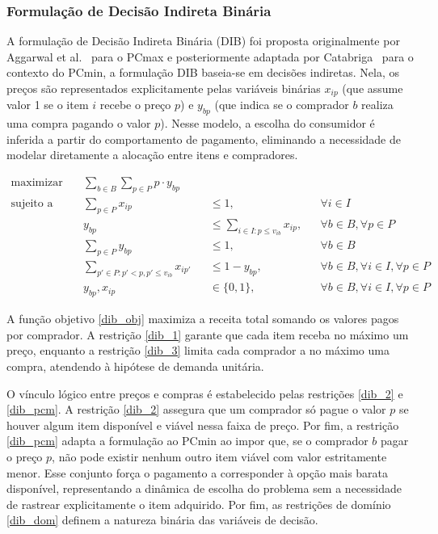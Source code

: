 \documentclass[11pt]{article}
\begin{document}
\subsubsection{Formulação de Decisão Indireta Binária}

A formulação de Decisão Indireta Binária (DIB) foi proposta originalmente por Aggarwal et al.~\cite{aggarwal2004} para o PCmax e posteriormente adaptada por Catabriga~\cite{catabriga2025} para o contexto do PCmin, a formulação DIB baseia-se em decisões indiretas. Nela, os preços são representados explicitamente pelas variáveis binárias $x_{ip}$ (que assume valor 1 se o item $i$ recebe o preço $p$) e $y_{bp}$ (que indica se o comprador $b$ realiza uma compra pagando o valor $p$). Nesse modelo, a escolha do consumidor é inferida a partir do comportamento de pagamento, eliminando a necessidade de modelar diretamente a alocação entre itens e compradores.

\begin{align}
\text{maximizar} \quad & \sum_{b \in B} \sum_{p \in P} p \cdot y_{bp} \label{dib_obj} \\
\text{sujeito a} \quad & \sum_{p \in P} x_{ip} &&\leq 1, && \forall i \in I \label{dib_1} \\
& y_{bp} &&\leq \sum_{i \in I: p \leq v_{ib}} x_{ip}, && \forall b \in B, \forall p \in P \label{dib_2} \\
& \sum_{p \in P} y_{bp} &&\leq 1, && \forall b \in B \label{dib_3} \\
& \sum_{p' \in P: p' < p, p' \leq v_{ib}} x_{ip'} &&\leq 1 - y_{bp}, && \forall b \in B, \forall i \in I, \forall p \in P \label{dib_pcm} \\
& y_{bp}, x_{ip} &&\in \{0, 1\}, && \forall b \in B, \forall i \in I, \forall p \in P \label{dib_dom}
\end{align}

A função objetivo \eqref{dib_obj} maximiza a receita total somando os valores pagos por comprador. A restrição \eqref{dib_1} garante que cada item receba no máximo um preço, enquanto a restrição \eqref{dib_3} limita cada comprador a no máximo uma compra, atendendo à hipótese de demanda unitária.

O vínculo lógico entre preços e compras é estabelecido pelas restrições \eqref{dib_2} e \eqref{dib_pcm}. A restrição \eqref{dib_2} assegura que um comprador só pague o valor $p$ se houver algum item disponível e viável nessa faixa de preço. Por fim, a restrição \eqref{dib_pcm} adapta a formulação ao PCmin ao impor que, se o comprador $b$ pagar o preço $p$, não pode existir nenhum outro item viável com valor estritamente menor. Esse conjunto força o pagamento a corresponder à opção mais barata disponível, representando a dinâmica de escolha do problema sem a necessidade de rastrear explicitamente o item adquirido. Por fim, as restrições de domínio \eqref{dib_dom} definem a natureza binária das variáveis de decisão. 
\end{document}
